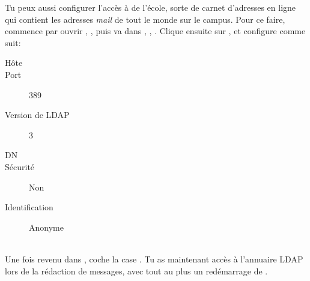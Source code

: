 Tu peux aussi configurer l'accès à  de l'école, sorte de carnet d'adresses en ligne qui contient les adresses \emph{mail} de tout le monde sur le campus. Pour ce faire, commence par ouvrir , , puis va dans , , . Clique ensuite sur , et configure comme suit: \\
\smallskip
\begin{minipage}{0.48\textwidth}
\begin{description}
  \item[Hôte] 
  \item[Port] 389
  \item[Version de LDAP] 3
\end{description}  
\end{minipage} 
\begin{minipage}{0.48\textwidth}
\begin{description}  
  \item[DN] 
  \item[Sécurité] Non
  \item[Identification] Anonyme
\end{description}
\end{minipage} \\
Une fois revenu dans , coche la case . Tu as maintenant accès à l'annuaire LDAP lors de la
rédaction de messages, avec tout au plus un redémarrage de . 
%
%
\noindent

